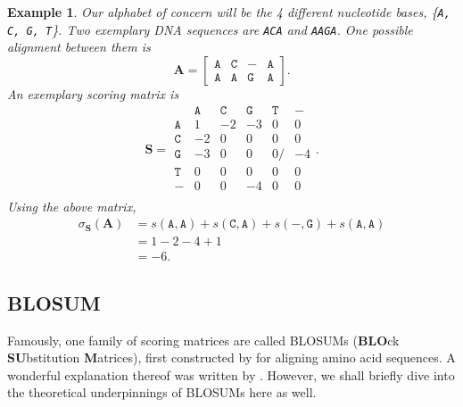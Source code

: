 \documentclass{article}
\newtheorem{example}{Example}
\begin{document}
\begin{example}
    Our alphabet of concern will be the 4
    different nucleotide bases, \{\texttt{A, C, G, T}\}. Two exemplary DNA
    sequences are \texttt{ACA} and \texttt{AAGA}. One possible alignment between them is
    \begin{equation*}
        \mathbf A = \begin{bmatrix}
            \mathtt{A} & \mathtt{C} & \mathtt{-} & \mathtt{A} \\
            \mathtt{A} & \mathtt{A} & \mathtt{G} & \mathtt{A}
        \end{bmatrix}.
    \end{equation*}
    An exemplary scoring matrix is 
    \begin{equation*}
        \mathbf S = \begin{matrix}
             & \mathtt{A} & \mathtt{C} & \mathtt{G} & \mathtt{T} &
            \mathtt{-}                                             \\ \mathtt{A} & 1          & -2         & -3         & 0
             &
            0
            \\ \mathtt{C} & -2         & 0          & 0          & 0
             & 0
            \\ \mathtt{G} & -3         & 0          & 0          & 0
             /& -4
            \\ \mathtt{T} & 0          & 0          & 0          & 0
             & 0
            \\ \mathtt{-} & 0          & 0          & -4         & 0
             & 0 \\
        \end{matrix}.
    \end{equation*}
    Using the above matrix, \begin{align}
	    \sigma_{\mathbf S}(\mathbf A) &= s(\mathtt A, \mathtt A) + s(\mathtt C, \mathtt A) + s(\mathtt{-}, \mathtt{G}) + s(\mathtt{A}, \mathtt{A}) \\
					  &= 1 - 2 -4 + 1 \\
					  &= -6.
    \end{align}
\end{example}

\subsection{BLOSUM}
Famously, one family of scoring matrices are called BLOSUMs (\textbf{BLO}ck \textbf{SU}bstitution \textbf{M}atrices), first constructed by \textcite{henikoffAminoAcidSubstitution1992} for aligning amino acid sequences. A wonderful explanation thereof was written by
\textcite{eddyWhereDidBLOSUM622004}. However, we shall briefly dive into the
theoretical underpinnings of BLOSUMs here as well.
\end{document}
